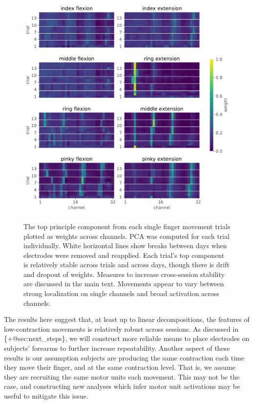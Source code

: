 \begin{figure}
\label{fig:PCA_components}
\centering
\includegraphics[width=1\textwidth,height=\textheight]{images/data_analysis/fingers/PCA_components.pdf}
\caption{The top principle component from each single finger movement
trials plotted as weights across channels. PCA was computed for each
trial individually. White horizontal lines show breaks between days when
electrodes were removed and reapplied. Each trial's top component is
relatively stable across trials and across days, though there is drift
and dropout of weights. Measures to increase cross-session stability are
discussed in the main text. Movements appear to vary between strong
localization on single channels and broad activation across
channels.}\label{fig:PCA_components}
\end{figure}

The results here suggest that, at least up to linear decompositions, the
features of low-contraction movements is relatively robust across
sessions. As discussed in \{+@sec:next\_steps\}, we will construct more
reliable means to place electrodes on subjects' forearms to further
increase repeatability. Another aspect of these results is our
assumption subjects are producing the same contraction each time they
move their finger, and at the same contraction level. That is, we assume
they are recruiting the same motor units each movement. This may not be
the case, and constructing new analyses which infer motor unit
activations may be useful to mitigate this issue.

